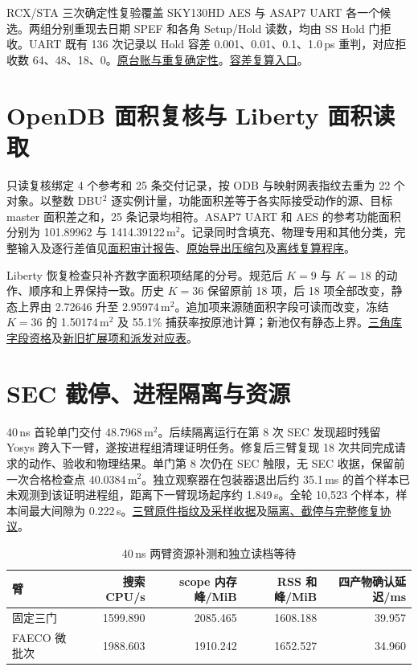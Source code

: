 \documentclass[10pt,a4paper,fontset=windows]{ctexart}
\newcommand{\Evidence}[2]{\href{https://github.com/Toylog123/FAECO/blob/f0fe992b9ce44b8368b620d06b8d95a56179347c/project_docs/evidence/#1}{#2}}
\newcommand{\Vfive}[2]{\Evidence{tcad_v5_revision_20261126/#1}{#2}}
\begin{document}
RCX/STA 三次确定性复验覆盖 SKY130HD AES 与 ASAP7 UART 各一个候选。两组分别重现去日期 SPEF 和各角 Setup/Hold 读数，均由 SS Hold 门拒收。UART 既有 136 次记录以 Hold 容差 0.001、0.01、0.1、1.0\,ps 重判，对应拒收数 64、48、18、0。\Evidence{tcad_v4_revision_20261126/LEF_AND_DETERMINISM_AUDIT.json}{原台账与重复确定性}。\Evidence{tcad_v4_revision_20261126/audit_hold_tolerance_and_table9.py}{容差复算入口}。

\section{OpenDB 面积复核与 Liberty 面积读取}\label{sec:E}

只读复核绑定 4 个参考和 25 条交付记录，按 ODB 与映射网表指纹去重为 22 个对象。以整数 DBU$^2$ 逐实例计量，功能面积差等于各实际接受动作的源、目标 master 面积差之和，25 条记录均相符。ASAP7 UART 和 AES 的参考功能面积分别为 101.89962 与 1414.39122\,\textmu m$^2$。记录同时含填充、物理专用和其他分类，完整输入及逐行差值见\Vfive{R5_DIRECT_ODB_AREA_REPORT.md}{面积审计报告}、\Vfive{R5_DIRECT_ODB_AREA_AUDIT.zip}{原始导出压缩包}及\Vfive{audit_r5_direct_odb_area.py}{离线复算程序}。

Liberty 恢复检查只补齐数字面积项结尾的分号。规范后 $K=9$ 与 $K=18$ 的动作、顺序和上界保持一致。历史 $K=36$ 保留原前 18 项，后 18 项全部改变，静态上界由 2.72646 升至 2.95974\,\textmu m$^2$。追加项来源随面积字段可读而改变，冻结 $K=36$ 的 1.50174\,\textmu m$^2$ 及 55.1\% 捕获率按原池计算；新池仅有静态上界。\Vfive{R4_ASAP7_LIBERTY_AUDIT.md}{三角库字段资格}及\Vfive{R5_ASAP7_UART_POOL_AUDIT.md}{新旧扩展项和派发对应表}。

\section{SEC 截停、进程隔离与资源}\label{sec:F}

40\,ns 首轮单门交付 48.7968\,\textmu m$^2$。后续隔离运行在第 8 次 SEC 发现超时残留 Yosys 跨入下一臂，遂按进程组清理证明任务。修复后三臂复现 18 次共同完成请求的动作、验收和物理结果。单门第 8 次仍在 SEC 触限，无 SEC 收据，保留前一次合格检查点 40.0384\,\textmu m$^2$。独立观察器在包装器退出后约 35.1\,ms 的首个样本已未观测到该证明进程组，距离下一臂现场起序约 1.849\,s。全轮 10,523 个样本，样本间最大间隙为 0.222\,s。\Vfive{V5_STAGE5_SEC_FIXED_VERIFIED.json}{三臂原件指纹及采样收据}及\Vfive{REPRODUCIBILITY.md}{隔离、截停与完整修复协议}。

\begin{longtable}{@{}lrrrr@{}}
\caption{40\,ns 两臂资源补测和独立读档等待}\label{supp:resources}\\
\toprule
臂 & 搜索 CPU/s & scope 内存峰/MiB & RSS 和峰/MiB & 四产物确认延迟/ms\\
\midrule
固定三门 & 1599.890 & 2085.465 & 1608.188 & 39.957\\
FAECO 微批次 & 1988.603 & 1910.242 & 1652.527 & 34.960\\
\bottomrule
\end{longtable}
\end{document}
